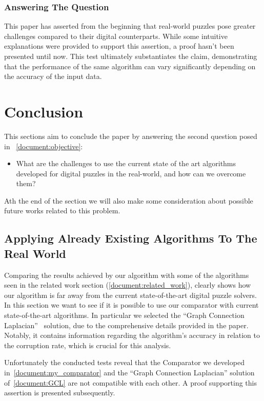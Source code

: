 \documentclass[epsfig,a4paper,11pt,titlepage,twoside,openany]{article}
\begin{document}
\subsubsection{Answering The Question}

This paper has asserted from the beginning that real-world puzzles
pose greater challenges compared to their digital counterparts.
While some intuitive explanations were provided to support this assertion,
a proof hasn't been presented until now. This test ultimately substantiates 
the claim, demonstrating that the performance of the same
algorithm can vary significantly depending on the accuracy of the input data.

\cleardoublepage
\section{Conclusion}

This sections aim to conclude the paper by answering the second question
posed in ~\cref{document:objective}:

\begin{itemize}
  \item What are the challenges to use the current state of the art algorithms developed for digital
                puzzles in the real-world, and how can we overcome them?
\end{itemize} 

Ath the end of the section we will also make some consideration about
possible future works related to this problem.

\subsection{Applying Already Existing Algorithms To The Real World}

Comparing the results achieved by our algorithm with some of the algorithms seen in the related
work section (\cref{document:related_work}), clearly shows how our algorithm is far away
from the current state-of-the-art digital puzzle solvers. In this section we want to
see if it is possible to use our comparator with current state-of-the-art algorithms.
In particular we selected the ``Graph Connection Laplacian''~\cite{GCL} solution, due to the
comprehensive details provided in the paper. Notably, it contains information
regarding the algorithm's accuracy in relation to the corruption rate,
which is crucial for this analysis.

Unfortunately the conducted tests reveal that the Comparator we developed in~\cref{document:my_comparator}
and the ``Graph Connection Laplacian'' solution of~\cref{document:GCL}
are not compatible with each other.
A proof supporting this assertion is presented subsequently.
\end{document}
